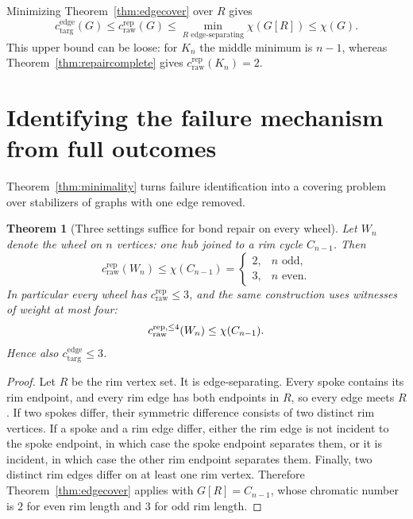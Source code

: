 \documentclass[11pt]{article}
\newtheorem{theorem}{Theorem}[section]
\theoremstyle{remark}
\newcommand{\cdiag}{c_{\mathrm{targ}}^{\mathrm{edge}}}
\newcommand{\crep}{c_{\mathrm{raw}}^{\mathrm{rep}}}
\begin{document}
Minimizing Theorem~\ref{thm:edgecover} over $R$ gives
\begin{equation}\label{eq:kesbound}
\cdiag(G)\le\crep(G)\le
\min_{R\text{ edge-separating}}\chi(G[R])\le\chi(G).
\end{equation}
This upper bound can be loose: for $K_n$ the middle minimum is $n-1$, whereas Theorem~\ref{thm:repaircomplete} gives $\crep(K_n)=2$.

\section{Identifying the failure mechanism from full outcomes}\label{sec:repaircontexts}
Theorem~\ref{thm:minimality} turns failure identification into a covering problem over stabilizers of graphs with one edge removed.

\begin{theorem}[Three settings suffice for bond repair on every wheel]\label{thm:wheels}
Let \(W_n\) denote the wheel on \(n\) vertices: one hub joined to a rim cycle \(C_{n-1}\). Then
\[
\crep(W_n)\le \chi(C_{n-1})=
\begin{cases}
2,& n \text{ odd},\\
3,& n \text{ even}.
\end{cases}
\]
In particular every wheel has \(\crep\le3\), and the same construction uses witnesses of weight at most four:
\[
c_{\rm raw}^{\rm rep,\le4}(W_n)\le\chi(C_{n-1}).
\]
Hence also $\cdiag\le3$.
\end{theorem}

\begin{proof}
Let \(R\) be the rim vertex set. It is edge-separating. Every spoke contains its rim endpoint, and every rim edge has both endpoints in \(R\), so every edge meets \(R\). If two spokes differ, their symmetric difference consists of two distinct rim vertices. If a spoke and a rim edge differ, either the rim edge is not incident to the spoke endpoint, in which case the spoke endpoint separates them, or it is incident, in which case the other rim endpoint separates them. Finally, two distinct rim edges differ on at least one rim vertex. Therefore Theorem~\ref{thm:edgecover} applies with \(G[R]=C_{n-1}\), whose chromatic number is \(2\) for even rim length and \(3\) for odd rim length.
\end{proof}
\end{document}
